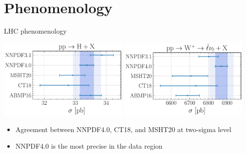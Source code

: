 \documentclass[aspectratio=169,9pt]{beamer}
\begin{document}
\section{Phenomenology}

\begin{frame}[t]{LHC phenomenology}
    \begin{center}
        \includegraphics[width=0.48\textwidth]{NNPDF_H_14TEV_40_PHENO-integrated}
        \hspace*{0.02\textwidth}
        \includegraphics[width=0.48\textwidth]{NNPDF_WP_14TEV_40_PHENO-integrated}\\
        \vspace*{1em}
        \begin{itemize}
            \item Agreement between NNPDF4.0, CT18, and MSHT20 at two-sigma level
            \item NNPDF4.0 is the most precise in the data region
        \end{itemize}
    \end{center}
\end{frame}
\end{document}
